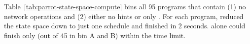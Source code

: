 

Table~\ref{tab:parrot-state-space-compute} bins all 95 programs that contain
(1) no network operations and (2) either no hints or only \computes. For each program,
\ecosys reduced the state space down to just one
schedule and finished in 2 seconds. \dbug alone could finish only
\nprogverifieddbug (out of 45 in bin A and B) within the time limit.

